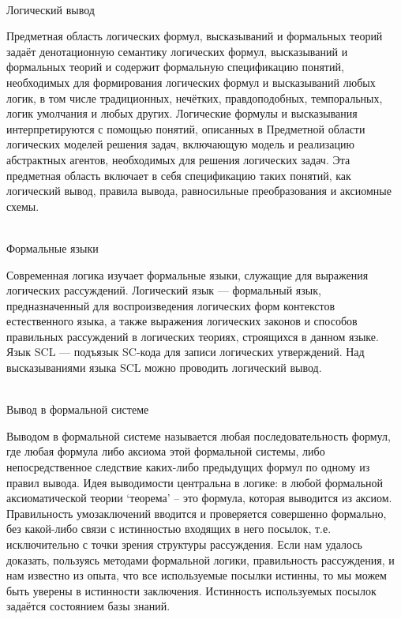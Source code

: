 \begin{frame}{\\Логический вывод}
    \vspace{10mm}
    \begin{scn}
        Предметная область логических формул, высказываний и формальных теорий задаёт денотационную семантику логических формул, высказываний и формальных теорий и содержит формальную спецификацию понятий, необходимых для формирования логических формул и высказываний любых логик, в том числе традиционных, нечётких, правдоподобных, темпоральных, логик умолчания и любых других. Логические формулы и высказывания интерпретируются с помощью понятий, описанных в Предметной области логических моделей решения задач, включающую модель и реализацию абстрактных агентов, необходимых для решения логических задач. Эта предметная область включает в себя спецификацию таких понятий, как логический вывод, правила вывода, равносильные преобразования и аксиомные схемы.
    \end{scn}
\end{frame}

\begin{frame}{\\Формальные языки}
    \begin{scn}
        Современная логика изучает формальные языки, служащие для выражения логических рассуждений. Логический язык — формальный язык, предназначенный для воспроизведения логических форм контекстов естественного языка, а также выражения логических законов и способов правильных рассуждений в логических теориях, строящихся в данном языке.
        \\Язык SCL — подъязык SC-кода для записи логических утверждений. Над высказываниями языка SCL можно проводить логический вывод.
    \end{scn}
\end{frame}

\begin{frame}{\\Вывод в формальной системе}
    \begin{scn}
    \vspace{10mm}
        Выводом в формальной системе называется любая последовательность формул, где любая формула либо аксиома этой формальной системы, либо непосредственное следствие каких-либо предыдущих формул по одному из правил вывода. Идея выводимости центральна в логике: в любой формальной аксиоматической теории ‘теорема’ – это формула, которая выводится из аксиом. Правильность умозаключений вводится и проверяется совершенно формально, без какой-либо связи с истинностью входящих в него посылок, т.е. исключительно с точки зрения структуры рассуждения. Если нам удалось доказать, пользуясь методами формальной логики, правильность рассуждения, и нам известно из опыта, что все используемые посылки истинны, то мы можем быть уверены в истинности заключения. Истинность используемых посылок задаётся состоянием базы знаний.
    \end{scn}
\end{frame}


